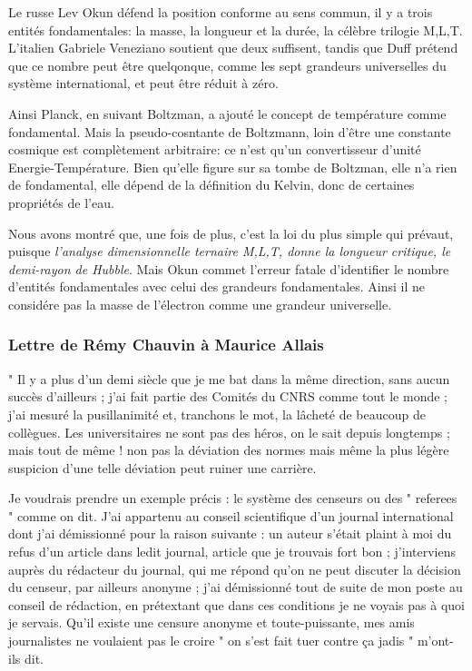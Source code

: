 \documentclass[a4paper,12pt]{article}
\begin{document}
Le russe Lev Okun défend la position conforme au sens commun, il y a trois entités fondamentales: la masse, la longueur et la durée, la célèbre trilogie M,L,T. L'italien Gabriele Veneziano soutient que deux suffisent, tandis que Duff prétend que ce nombre peut être quelqonque, comme les sept grandeurs universelles du système international, et peut être réduit à zéro. 

Ainsi Planck, en suivant Boltzman, a ajouté le concept de température comme fondamental. Mais la pseudo-cosntante de Boltzmann, loin d'être une constante cosmique est complètement arbitraire: ce n'est qu'un convertisseur d'unité Energie-Température. Bien qu'elle figure sur sa tombe de Boltzman, elle n'a rien de fondamental, elle dépend de la définition du Kelvin, donc de certaines propriétés de l'eau.

Nous avons montré que, une fois de plus, c'est la loi du plus simple qui prévaut, puisque \textit{l'analyse dimensionnelle ternaire M,L,T, donne la longueur critique, le demi-rayon de Hubble}. Mais Okun commet l'erreur fatale d'identifier le nombre d'entités fondamentales avec celui des grandeurs fondamentales. Ainsi il ne considére pas la masse de l'électron comme une grandeur universelle.



\subsubsection {Lettre de Rémy Chauvin à Maurice Allais}

" Il y a plus d’un demi siècle que je me bat dans la même direction, sans aucun succès d’ailleurs ; j’ai fait partie des Comités du CNRS comme tout le monde ; j’ai mesuré la pusillanimité et, tranchons le mot, la lâcheté de beaucoup de collègues. Les universitaires ne sont pas des héros, on le sait depuis longtemps ; mais tout de même ! non pas la déviation des normes mais même la plus légère suspicion d’une telle déviation peut ruiner une carrière. 

Je voudrais prendre un exemple précis : le système des censeurs ou des " referees " comme on dit. J’ai appartenu au conseil scientifique d’un journal international dont j’ai démissionné pour la raison suivante : un auteur s’était plaint à moi du refus d’un article dans ledit journal, article que je trouvais fort bon ; j’interviens auprès du rédacteur du journal, qui me répond qu’on ne peut discuter la décision du censeur, par ailleurs anonyme ; j’ai démissionné tout de suite de mon poste au conseil de rédaction, en prétextant que dans ces conditions je ne voyais pas à quoi je servais. 
Qu’il existe une censure anonyme et toute-puissante, mes amis journalistes ne voulaient pas le croire " on s’est fait tuer contre ça jadis " m’ont-ils dit.
\end{document}
